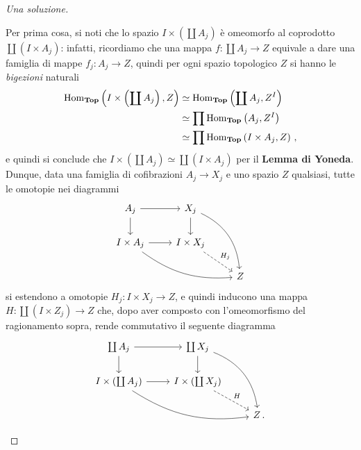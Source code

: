 \begin{exercise}
\begin{proof}[Una soluzione]
\begin{rmnumerate}
			\item Per prima cosa, si noti che lo spazio $I \times \left(\coprod A_{j} \right)$
			è omeomorfo al coprodotto $\coprod \left(I \times A_{j}\right)$: infatti,
			ricordiamo che una mappa $f:\coprod A_{j} \to Z$ equivale a dare una famiglia
			di mappe $f_{j}:A_{j} \to Z$, quindi per ogni spazio topologico $Z$
			si hanno le \emph{bigezioni} naturali
			\begin{align*}
				\operatorname{Hom}_{{\normalfont\textbf{Top}}}\left( I \times \left(\coprod A_{j} \right), Z \right)
				&\simeq \operatorname{Hom}_{{\normalfont\textbf{Top}}}\left(\coprod A_{j} , Z^{I} \right) \\
				&\simeq \prod \operatorname{Hom}_{{\normalfont\textbf{Top}}}\left( A_{j}, Z^{I} \right) \\
				&\simeq \prod \operatorname{Hom}_{{\normalfont\textbf{Top}}}\left( I \times A_{j}, Z \right)\,,
			\end{align*}
			e quindi si conclude che $I \times \left(\coprod A_{j} \right) 
			\simeq \coprod \left(I \times A_{j}\right)$ per il \textbf{Lemma di Yoneda}.
			Dunque, data una famiglia di cofibrazioni $A_{j} \to X_{j}$ e uno
			spazio $Z$ qualsiasi, tutte le omotopie nei diagrammi
			\begin{equation*}
				\begin{tikzcd}
					A_{j} \ar[r] \ar[d] & X_{j} \ar[d] \ar[ddr, bend left] & \\
					I \times A_{j} \ar[r] \ar[rrd,  bend right=20pt] 
					& I \times X_{j} \ar[dr, "H_{j}", dashed] & \\
					& & Z
				\end{tikzcd}
			\end{equation*}
			si estendono a omotopie $H_{j}:I \times X_{j} \to Z$, 
			e quindi inducono una mappa $H:\coprod \left(I \times Z_{j}\right) \to Z$ che,
			dopo aver composto con l'omeomorfismo del ragionamento sopra, 
			rende commutativo il seguente diagramma
			\begin{equation*}
				\begin{tikzcd}
					\coprod A_{j} \ar[r] \ar[d] & \coprod X_{j} \ar[d] \ar[ddr, bend left] & \\
					I \times \left( \coprod A_{j} \right) \ar[r] \ar[rrd, bend right=20pt] 
					& I \times \left( \coprod X_{j} \right) \ar[dr, "H", dashed] & \\
					& & Z\,.
				\end{tikzcd}
			\end{equation*}
			

\end{rmnumerate}
\end{proof}
\end{exercise}
